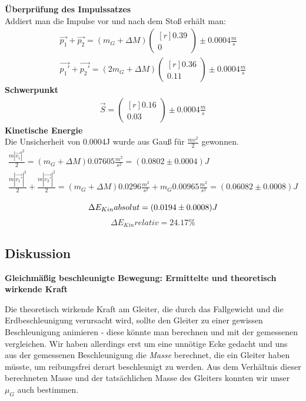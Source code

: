 \documentclass{article}
\begin{document}
\textbf{Überprüfung des Impulssatzes} \\
Addiert man die Impulse vor und nach dem Stoß erhält man:
\begin{gather*}
\vec{p_1}+\vec{p_2}=(m_G+\Delta M)
\begin{pmatrix*}[r]
0.39 \\ 0
\end{pmatrix*}\pm 0.0004 \frac{m}{s} \\
\vec{p_1'}+\vec{p_2'}=(2m_G+\Delta M)
\begin{pmatrix*}[r]
0.36 \\ 0.11
\end{pmatrix*}\pm 0.0004  \frac{m}{s}
\end{gather*}
\textbf{Schwerpunkt}
\begin{gather*}
\vec{S}=
\begin{pmatrix*}[r]
0.16 \\ 0.03
\end{pmatrix*} \pm 0.0004 \frac{m}{s}
\end{gather*}
\textbf{Kinetische Energie} \\
Die Unsicherheit von 0.0004J wurde aus Gauß für $\frac{mv^2}{2}$ gewonnen.\\
\begin{gather*}
\frac{m|\vec{v_1}|^2}{2}=(m_G+\Delta M)0.07605\frac{m^2}{s^2}=(0.0802 \pm 0.0004)J \\
\frac{m|\vec{v_1'}|^2}{2}+\frac{m|\vec{v_2'}|^2}{2}=(m_G+\Delta M)0.0296\frac{m^2}{s^2} + m_G0.00965\frac{m^2}{s^2}=(0.06082 \pm 0.0008) J \\
\end{gather*} 
\begin{equation*}
\Delta E_{Kin} absolut=(0.0194 \pm 0.0008) J \\
\end{equation*}
\begin{equation*}
\Delta E_{Kin}relativ=24.17\%
\end{equation*}




\subsection{Diskussion}
\textbf{Gleichmäßig beschleunigte Bewegung: Ermittelte und theoretisch wirkende Kraft}

Die theoretisch wirkende Kraft am Gleiter, die durch das Fallgewicht und die Erdbeschleunigung verursacht wird, sollte den Gleiter zu einer gewissen Beschleunigung animieren - diese könnte man berechnen und mit der gemessenen vergleichen. Wir haben allerdings erst um eine unnötige Ecke gedacht und uns aus der gemessenen Beschleunigung die \textit{Masse} berechnet, die ein Gleiter haben müsste, um reibungsfrei derart beschleunigt zu werden. Aus dem Verhältnis dieser berechneten Masse und der tatsächlichen Masse des Gleiters konnten wir unser $\mu_G$ auch bestimmen. 
\end{document}
